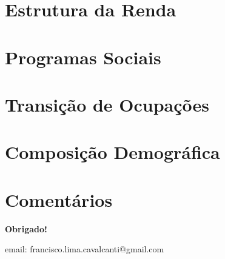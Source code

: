 \documentclass[11pt]{beamer}
\begin{document}
\section{Estrutura da Renda}



\section{Programas Sociais}



\section{Transição de Ocupações}



\section{Composição Demográfica}



\section{Comentários}


\frame
{
    \begin{center}
     \vfill
    \textbf{Obrigado!}
     \\

     \begin{small}
     email: francisco.lima.cavalcanti@gmail.com
     \end{small}
     \vfill
\end{center}
}
\end{document}
